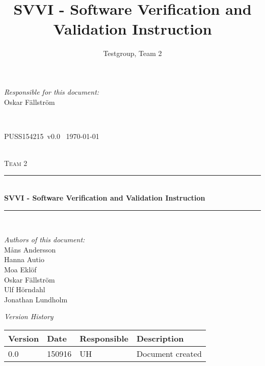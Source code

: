 \documentclass[a4paper]{article}
\title{SVVI - Software Verification and Validation Instruction}
\author{Testgroup, Team 2}
\newcommand{\version}{v0.0}
\newcommand{\SVVI}{PUSS154215}
\begin{document}
\begin{titlepage}
\newcommand{\HRule}{\rule{\linewidth}{0.5mm}}

\begin{minipage}{0.5\textwidth}
\begin{flushleft} %
\textit{Responsible for this document:}\\
Oskar Fällström %
\end{flushleft}
\end{minipage}
~
\begin{minipage}{0.4\textwidth}
\begin{flushright}
\SVVI\ \version\ %
\today
\end{flushright}
\end{minipage}\\[3cm]

\centering
\textsc{\LARGE Team 2}\\[0.5cm]

\HRule \\[0.4cm]
{ \huge \bfseries SVVI - Software Verification and Validation Instruction }\\[0.4cm] %
\HRule \\[1.5cm]

\vfill
\begin{flushleft}
\textit{Authors of this document:}\\
Måns Andersson \\
Hanna Autio \\
Moa Eklöf \\
Oskar Fällström \\
Ulf Hörndahl \\
Jonathan Lundholm
\end{flushleft}


\end{titlepage}

\begin{center}
\textit{\large Version History}

    \begin{tabular}{ | l | l | l | p{5cm} |}
    \hline
    \textbf{Version}		& \textbf{Date}		& \textbf{Responsible}					& \textbf{Description}					\\ \hline
    0.0						& 150916 			& UH									& Document created						\\ \hline
    \end{tabular}
\end{center}
\end{document}
